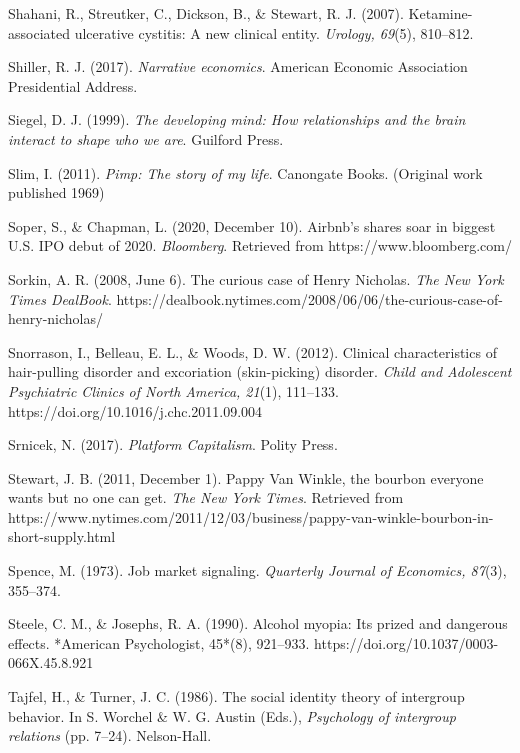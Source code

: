 \begin{thebibliography}{}
    Shahani, R., Streutker, C., Dickson, B., \& Stewart, R. J. (2007). Ketamine-associated ulcerative cystitis: A new clinical entity. \textit{Urology, 69}(5), 810–812.

    Shiller, R. J. (2017). \textit{Narrative economics}. American Economic Association Presidential Address.

    Siegel, D. J. (1999). \textit{The developing mind: How relationships and the brain interact to shape who we are}. Guilford Press.

    Slim, I. (2011). \textit{Pimp: The story of my life}. Canongate Books. (Original work published 1969)

    Soper, S., \& Chapman, L. (2020, December 10). Airbnb’s shares soar in biggest U.S. IPO debut of 2020. \textit{Bloomberg}. Retrieved from https://www.bloomberg.com/

    Sorkin, A. R. (2008, June 6). The curious case of Henry Nicholas. \textit{The New York Times DealBook}. https://dealbook.nytimes.com/2008/06/06/the-curious-case-of-henry-nicholas/

    Snorrason, I., Belleau, E. L., \& Woods, D. W. (2012). Clinical characteristics of hair-pulling disorder and excoriation (skin-picking) disorder. \textit{Child and Adolescent Psychiatric Clinics of North America, 21}(1), 111–133. https://doi.org/10.1016/j.chc.2011.09.004

    Srnicek, N. (2017). \textit{Platform Capitalism}. Polity Press.

    Stewart, J. B. (2011, December 1). Pappy Van Winkle, the bourbon everyone wants but no one can get. \textit{The New York Times}. Retrieved from https://www.nytimes.com/2011/12/03/business/pappy-van-winkle-bourbon-in-short-supply.html

    Spence, M. (1973). Job market signaling. \textit{Quarterly Journal of Economics, 87}(3), 355–374.

    Steele, C. M., \& Josephs, R. A. (1990). Alcohol myopia: Its prized and dangerous effects. *American Psychologist, 45*(8), 921–933. https://doi.org/10.1037/0003-066X.45.8.921

    
    Tajfel, H., \& Turner, J. C. (1986). The social identity theory of intergroup behavior. In S. Worchel \& W. G. Austin (Eds.), \textit{Psychology of intergroup relations} (pp. 7–24). Nelson-Hall.


\end{thebibliography}
